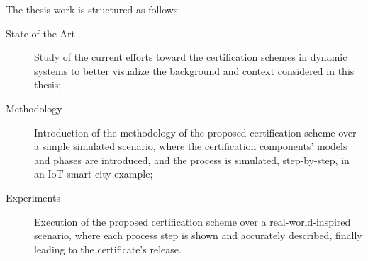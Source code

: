 \newpage
The thesis work is structured as follows:
\begin{description}
    \item[State of the Art] Study of the current efforts toward the certification schemes in dynamic systems to better visualize the background and context considered in this thesis;
    \item[Methodology] Introduction of the methodology of the proposed certification scheme over a simple simulated scenario, where the certification components' models and phases are introduced, and the process is simulated, step-by-step, in an IoT smart-city example;
    \item[Experiments] Execution of the proposed certification scheme over a real-world-inspired scenario, where each process step is shown and accurately described, finally leading to the certificate's release.
\end{description}